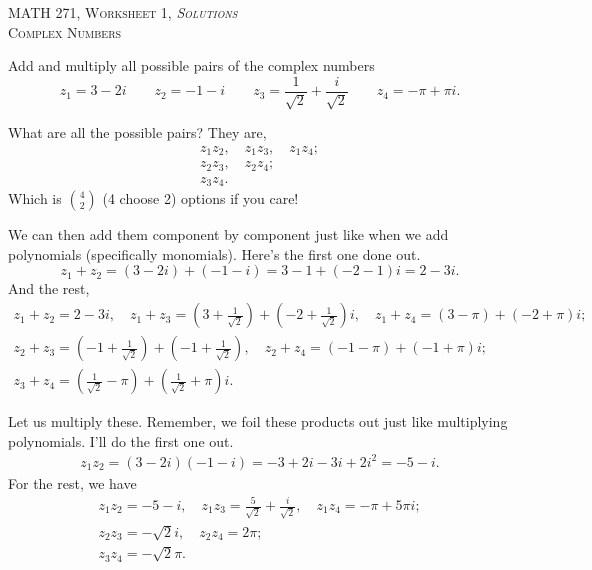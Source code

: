 \documentclass[12pt]{article} %
\begin{document}
\begin{center}
   \textsc{\large MATH 271, Worksheet 1, \emph{Solutions}}\\
   \textsc{Complex Numbers}
\end{center}
\vspace{.5cm}

\begin{problem}
Add and multiply all possible pairs of the complex numbers
\[
z_1 = 3-2i \qquad z_2 = -1-i \qquad z_3 = \frac{1}{\sqrt{2}}+\frac{i}{\sqrt{2}} \qquad z_4 = -\pi + \pi i.
\]
\end{problem}

\begin{solution}
What are all the possible pairs? They are,
\begin{align*}
    z_1 z_2, \quad z_1 z_3, \quad z_1 z_4;\\
    z_2 z_3, \quad z_2 z_4;\\
    z_3 z_4.
\end{align*}
Which is $\binom{4}{2}$ (4 choose 2) options if you care!

We can then add them component by component just like when we add polynomials (specifically monomials). Here's the first one done out.
\[
z_1+z_2=(3-2i)+(-1-i)=3-1+(-2-1)i=2-3i.
\]
And the rest,
\begin{align*}
    z_1 + z_2=2-3i, \quad z_1 + z_3=\left(3+\frac{1}{\sqrt{2}}\right)+\left(-2+\frac{1}{\sqrt{2}}\right)i, \quad z_1 + z_4=(3-\pi)+(-2+\pi)i;\\
    z_2+ z_3= \left(-1+\frac{1}{\sqrt{2}}\right) + \left(-1+\frac{1}{\sqrt{2}}\right), \quad z_2 + z_4 = (-1-\pi)+(-1+\pi)i;\\
    z_3+z_4=\left(\frac{1}{\sqrt{2}}-\pi\right)+\left(\frac{1}{\sqrt{2}}+\pi\right)i.
\end{align*}

Let us multiply these. Remember, we foil these products out just like multiplying polynomials. I'll do the first one out.
\begin{align*}
    z_1z_2 = (3-2i)(-1-i)=-3+2i-3i+2i^2=-5 -i.
\end{align*}
For the rest, we have
\begin{align*}
    z_1 z_2= -5-i, \quad z_1 z_3=\frac{5}{\sqrt{2}}+\frac{i}{\sqrt{2}}, \quad z_1 z_4=-\pi +5\pi i;\\
    z_2 z_3=-\sqrt{2}i, \quad z_2 z_4=2\pi;\\
    z_3 z_4=-\sqrt{2}\pi.
\end{align*}
\end{solution}
\end{document}
